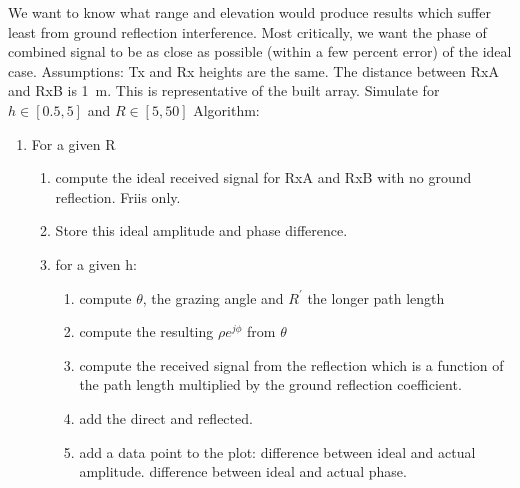 We want to know what range and elevation would produce results which suffer least from ground reflection interference. Most critically, we want the phase of combined signal to be as close as possible (within a few percent error) of the ideal case. 
Assumptions: Tx and Rx heights are the same. The distance between RxA and RxB is \SI{1}{\meter}. This is representative of the built array. Simulate for \(h \in \left[ 0.5 , 5 \right]\) and \(R \in \left[5, 50\right]\)
Algorithm:
\begin{enumerate}
  \item For a given R
    \begin{enumerate}
      \item compute the ideal received signal for RxA and RxB with no ground reflection. Friis only.
      \item Store this ideal amplitude and phase difference.
      \item for a given h:
        \begin{enumerate}
          \item compute \(\theta\), the grazing angle and \(R^\prime\) the longer path length
          \item compute the resulting \(\rho e^{j\phi}\) from \(\theta\)
          \item compute the received signal from the reflection which is a function of the path length multiplied by the ground reflection coefficient. 
          \item add the direct and reflected.
          \item add a data point to the plot: difference between ideal and actual amplitude. difference between ideal and actual phase.
        \end{enumerate}
    \end{enumerate}
\end{enumerate}
